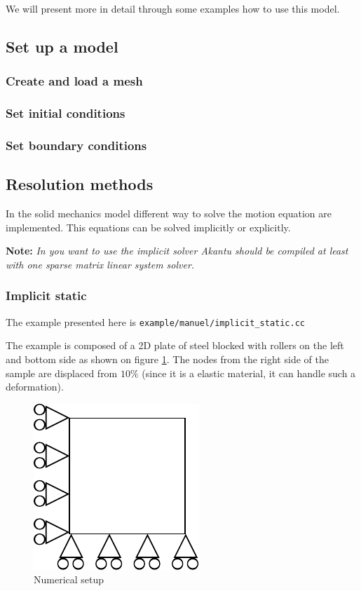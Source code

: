 \documentclass[a4paper,11pt]{book}
\newcommand{\code}[1]{{\tt{#1}}}
\newcommand{\note}[1]{\textbf{Note: }\textit{#1}}
\begin{document}
We will present more in detail through some examples how to use this model.

\subsection{Set up a model}
\subsubsection{Create and load a mesh}
\subsubsection{Set initial conditions}
\subsubsection{Set boundary conditions}\label{sect:smm:boundary}

\subsection{Resolution methods}
In the  solid mechanics  model different  way to solve  the motion  equation are
implemented. This equations can be solved implicitly or explicitly.

\note{In you want to use the  implicit solver Akantu should be compiled at least
  with one sparse matrix linear system solver.}

\subsubsection{Implicit static}\label{sect:smm:implicit:static}
The example presented here is \code{example/manuel/implicit\_static.cc}

The example is composed of a 2D  plate of steel blocked with rollers on the left
and bottom side as shown on figure \ref{fig:smm:implicit:static}. The nodes from
the right side  of the sample are  displaced from $10\%$ (since it  is a elastic
material, it can handle such a deformation).

\begin{figure}[!htb]
  \centering
  \includegraphics{figures/implicit_static}
  \caption{Numerical setup}
  \label{fig:smm:implicit:static}
\end{figure}
\end{document}
